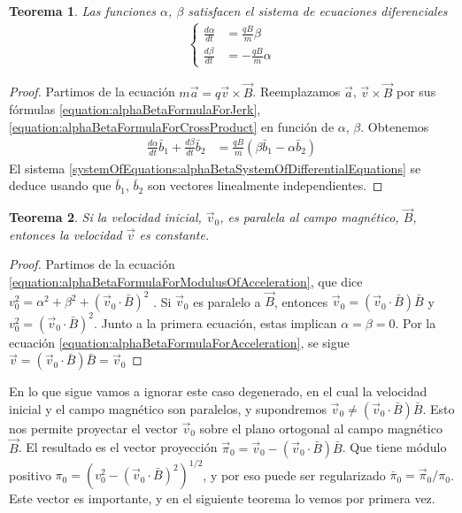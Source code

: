 \documentclass{article}
\newtheorem{theorem}{Teorema}
\begin{document}
  \begin{theorem}
    Las funciones \(\alpha\), \(\beta\) satisfacen el sistema de ecuaciones diferenciales
    \begin{align}
      \label{systemOfEquations:alphaBetaSystemOfDifferentialEquations}
      \left\{
        \begin{aligned}
          \frac{d \alpha}{d t} &= \frac{q B}{m} \beta
          \\
          \frac{d \beta}{d t} &= - \frac{q B}{m} \alpha
        \end{aligned}
      \right.
    \end{align}
  \end{theorem}
  \begin{proof}
    Partimos de la ecuación \(m \vec{a} = q \vec{v} \times \vec{B}\).
    Reemplazamos \(\vec{a}\), \(\vec{v} \times \vec{B}\) por sus fórmulas \eqref{equation:alphaBetaFormulaForJerk}, \eqref{equation:alphaBetaFormulaForCrossProduct} en función de \(\alpha\), \(\beta\).
    Obtenemos
    \begin{align}
      \frac{d \alpha}{d t} \bar{b}_1 + \frac{d \beta}{d t} \bar{b}_2
      &=
      \frac{q B}{m} (\beta \bar{b}_1 - \alpha \bar{b}_2)
    \end{align}
    El sistema \eqref{systemOfEquations:alphaBetaSystemOfDifferentialEquations} se deduce usando que \(\bar{b}_1\), \(\bar{b}_2\) son vectores linealmente independientes.
  \end{proof}

  \begin{theorem}
    Si la velocidad inicial, \(\vec{v}_0\), es paralela al campo magnético, \(\vec{B}\), entonces la velocidad \(\vec{v}\) es constante.
  \end{theorem}
  \begin{proof}
    Partimos de la ecuación \eqref{equation:alphaBetaFormulaForModulusOfAcceleration}, que dice \(
      v_0^2
      =
      \alpha^2 + \beta^2
      + (\vec{v}_0 \cdot \bar{B})^2
    \)
    .
    Si \(\vec{v}_0\) es paralelo a \(\vec{B}\), entonces \(\vec{v}_0 = (\vec{v}_0 \cdot \bar{B}) \bar{B}\) y \(v_0^2 = (\vec{v}_0 \cdot \bar{B})^2\).
    Junto a la primera ecuación, estas implican \(\alpha = \beta = 0\).
    Por la ecuación \eqref{equation:alphaBetaFormulaForAcceleration}, se sigue \(\vec{v} = (\vec{v}_0 \cdot \bar{B}) \bar{B} = \vec{v}_0\)
  \end{proof}

  En lo que sigue vamos a ignorar este caso degenerado, en el cual la velocidad inicial y el campo magnético son paralelos, y supondremos \(\vec{v}_0 \neq (\vec{v}_0 \cdot \bar{B}) \bar{B}\).
  Esto nos permite proyectar el vector \(\vec{v}_0\) sobre el plano ortogonal al campo magnético \(\vec{B}\).
  El resultado es el vector proyección \(\vec{\pi}_0 = \vec{v}_0 - (\vec{v}_0 \cdot \bar{B}) \bar{B}\).
  Que tiene módulo positivo \(\pi_0 = (v_0^2 - (\vec{v}_0 \cdot \bar{B})^2)^{1 / 2}\), y por eso puede ser regularizado \(\bar{\pi}_0 = \vec{\pi}_0 / \pi_0\).
  Este vector es importante, y en el siguiente teorema lo vemos por primera vez.
\end{document}
